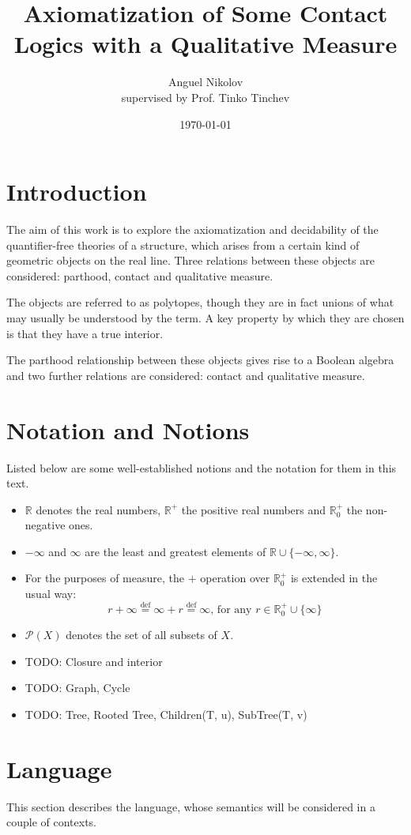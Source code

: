 \documentclass{article}
\title{Axiomatization of Some Contact Logics with a Qualitative Measure}
\author{Anguel Nikolov\\{\small supervised by Prof. Tinko Tinchev}}
\affil{Faculty of Mathematics and Informatics \\
  Sofia University ``St. Kliment Ohridski''}
\date{\today}
\newcommand{\R}{\mathbb{R}}
\newcommand{\pwrset}{\mathcal{P}}
\newcommand{\eqdef}{\stackrel{\text{def}}{=}}
\begin{document}
\maketitle

\section{Introduction}

The aim of this work is to explore the axiomatization and decidability of the quantifier-free theories of a structure, which arises from a certain kind of geometric objects on the real line. Three relations between these objects are considered: parthood, contact and qualitative measure.

The objects are referred to as polytopes, though they are in fact unions of what may usually be understood by the term. A key property by which they are chosen is that they have a true interior.

The parthood relationship between these objects gives rise to a Boolean algebra and two further relations are considered: contact and qualitative measure.
\section{Notation and Notions}
Listed below are some well-established notions and the notation for them in this text.
\begin{itemize}
\item $\R$ denotes the real numbers, $\R^+$ the positive real numbers and $\R^+_0$ the non-negative ones.
\item $-\infty$ and $\infty$ are the least and greatest elements of $\R \cup \{-\infty, \infty\}$.
\item For the purposes of measure, the $+$ operation over $\R^+_0$ is extended in the usual way:
  \begin{equation*}
    r + \infty \eqdef \infty + r \eqdef \infty \text{, for any } r \in \R^+_0 \cup \{\infty\}
  \end{equation*}
\item $\pwrset(X)$ denotes the set of all subsets of $X$.
\item TODO: Closure and interior
\item TODO: Graph, Cycle
\item TODO: Tree, Rooted Tree, Children(T, u), SubTree(T, v)
\end{itemize}
\section{Language}
This section describes the language, whose semantics will be considered in a couple of contexts.
\end{document}
